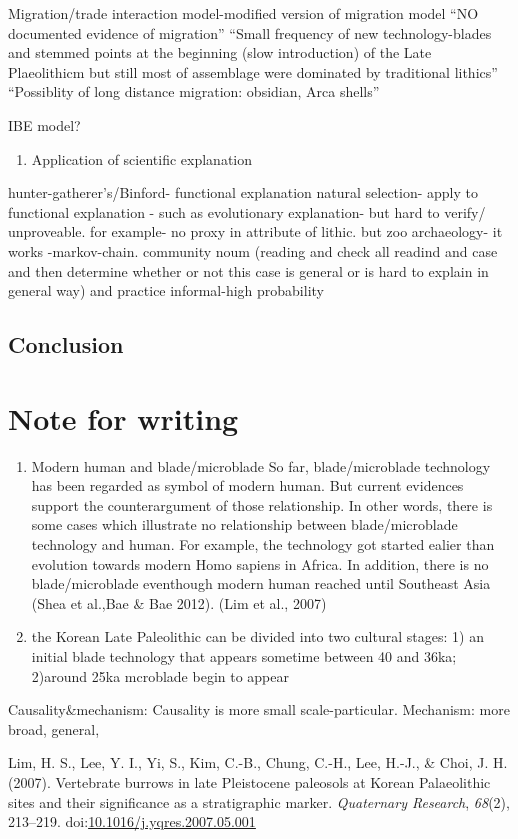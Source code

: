 \documentclass[american,man]{apa6}
\begin{document}
Migration/trade interaction model-modified version of migration model
\enquote{NO documented evidence of migration} \enquote{Small frequency
of new technology-blades and stemmed points at the beginning (slow
introduction) of the Late Plaeolithicm but still most of assemblage were
dominated by traditional lithics} \enquote{Possiblity of long distance
migration: obsidian, Arca shells}

IBE model?

\begin{enumerate}
\def\labelenumi{\arabic{enumi})}
\setcounter{enumi}{1}
\itemsep1pt\parskip0pt
\item
  Application of scientific explanation
\end{enumerate}

hunter-gatherer's/Binford- functional explanation natural selection-
apply to functional explanation - such as evolutionary explanation- but
hard to verify/ unproveable. for example- no proxy in attribute of
lithic. but zoo archaeology- it works -markov-chain. community noum
(reading and check all readind and case and then determine whether or
not this case is general or is hard to explain in general way) and
practice informal-high probability

\subsection{Conclusion}\label{conclusion}

\section{Note for writing}\label{note-for-writing}

\begin{enumerate}
\def\labelenumi{(\arabic{enumi})}
\item
  Modern human and blade/microblade So far, blade/microblade technology
  has been regarded as symbol of modern human. But current evidences
  support the counterargument of those relationship. In other words,
  there is some cases which illustrate no relationship between
  blade/microblade technology and human. For example, the technology got
  started ealier than evolution towards modern Homo sapiens in Africa.
  In addition, there is no blade/microblade eventhough modern human
  reached until Southeast Asia (Shea et al.,Bae \& Bae 2012). (Lim et
  al., 2007)
\item
  the Korean Late Paleolithic can be divided into two cultural stages:
  1) an initial blade technology that appears sometime between 40 and
  36ka; 2)around 25ka mcroblade begin to appear
\end{enumerate}

Causality\&mechanism: Causality is more small scale-particular.
Mechanism: more broad, general,

Lim, H. S., Lee, Y. I., Yi, S., Kim, C.-B., Chung, C.-H., Lee, H.-J., \&
Choi, J. H. (2007). Vertebrate burrows in late Pleistocene paleosols at
Korean Palaeolithic sites and their significance as a stratigraphic
marker. \emph{Quaternary Research}, \emph{68}(2), 213--219.
doi:\href{http://dx.doi.org/10.1016/j.yqres.2007.05.001}{10.1016/j.yqres.2007.05.001}
\end{document}
